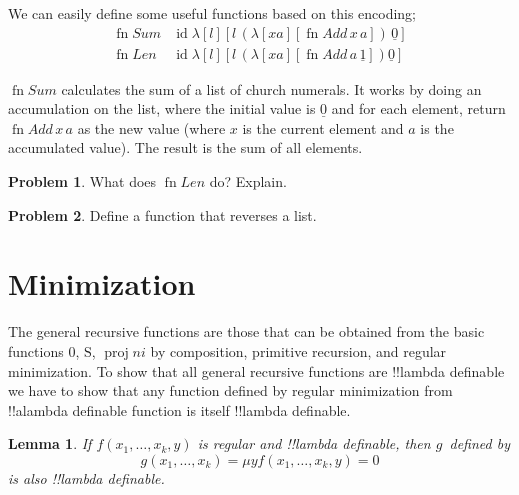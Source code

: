 \documentclass[10pt,a4paper]{article}
\theoremstyle{plain}
\newtheorem{lem}[thm]{Lemma}
\theoremstyle{definition}
\newtheorem{prob}{Problem}[section]
\theoremstyle{remark}
\newcommand*{\olfileid}[3]{}
\newcommand*{\olsection}[1]{\section*{#1}}
\newcommand*{\ollabel}[1]{\label{#1}}
\providecommand{\num}[1]{\underline{#1}}
\providecommand{\Zero}{\ensuremath{0}}
\providecommand{\Succ}{\ensuremath{\mathrm{S}}}
\providecommand{\lambd}{\ensuremath{\lambda}}
\providecommand{\Proj}{\operatorname{proj}}
\providecommand{\umin}{\mu}
\providecommand{\ident}{\operatorname{id}}
\providecommand{\fn}{\operatorname{fn}}
\begin{document}
We can easily define some useful functions based on this encoding; 
\begin{align*}
  \fn{Sum} & \ident
  \lambd[l][l \, (\lambd[xa][\fn{Add} \, x \, a])\,  \num{0}]\\
  \fn{Len} & \ident
  \lambd[l][l \, (\lambd[xa][\fn{Add} \, a \, \num{1}]) \num{0}]
\end{align*}

$\fn{Sum}$ calculates the sum of a list of church numerals. It works
by doing an accumulation on the list, where the initial value is
$\num{0}$ and for each element, return $\fn{Add} \, x\, a$ as the new
value (where $x$ is the current element and $a$ is the accumulated
value). The result is the sum of all elements.

\begin{prob}
  What does $\fn{Len}$ do? Explain.
\end{prob}

\begin{prob}
  Define a function that reverses a list.
\end{prob}





\olfileid{lam}{ldf}{min}
\olsection{Minimization}

The general recursive functions are those that can be obtained from
the basic functions $\Zero$, $\Succ$, $\Proj{n}{i}$ by composition,
primitive recursion, and regular minimization. To show that all
general recursive functions are !!{lambda definable} we have to show
that any function defined by regular minimization from !!a{lambda
  definable} function is itself !!{lambda definable}.

\begin{lem}
  \ollabel{lem:min} If $f(x_1, \dots, x_k, y)$ is regular and
  !!{lambda definable}, then $g$~defined by
  \[
  g(x_1, \dots, x_k) = \umin{y}{f(x_1,\dots,x_k, y) = 0}
  \]
  is also !!{lambda definable}.
\end{lem}
\end{document}
